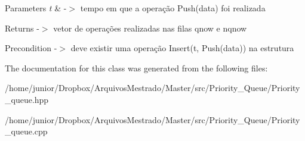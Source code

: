 \begin{DoxyParams}{Parameters}
{\em t} & -\/$>$ tempo em que a operação Push(data) foi realizada \\
\hline
\end{DoxyParams}
\begin{DoxyReturn}{Returns}
-\/$>$ vetor de operações realizadas nas filas qnow e nqnow 
\end{DoxyReturn}
\begin{DoxyPrecond}{Precondition}
-\/$>$ deve existir uma operação Insert(t, Push(data)) na estrutura 
\end{DoxyPrecond}


The documentation for this class was generated from the following files\+:\begin{DoxyCompactItemize}
\item 
/home/junior/\+Dropbox/\+Arquivos\+Mestrado/\+Master/src/\+Priority\+\_\+\+Queue/Priority\+\_\+queue.\+hpp\item 
/home/junior/\+Dropbox/\+Arquivos\+Mestrado/\+Master/src/\+Priority\+\_\+\+Queue/Priority\+\_\+queue.\+cpp\end{DoxyCompactItemize}
